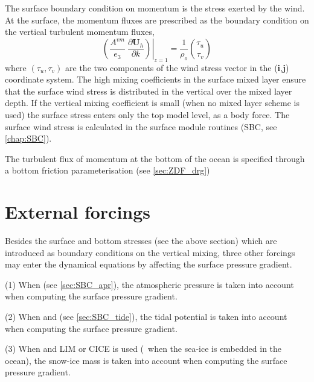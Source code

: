 \documentclass[../main/NEMO_manual]{subfiles}
\begin{document}
The surface boundary condition on momentum is the stress exerted by the wind.
At the surface, the momentum fluxes are prescribed as the boundary condition on
the vertical turbulent momentum fluxes,
\begin{equation}
  \label{eq:DYN_zdf_sbc}
  \left.{\left( {\frac{A^{vm} }{e_3 }\ \frac{\partial \textbf{U}_h}{\partial k}} \right)} \right|_{z=1}
  = \frac{1}{\rho_o} \binom{\tau_u}{\tau_v }
\end{equation}
where $\left( \tau_u ,\tau_v \right)$ are the two components of the wind stress vector in
the (\textbf{i},\textbf{j}) coordinate system.
The high mixing coefficients in the surface mixed layer ensure that the surface wind stress is distributed in
the vertical over the mixed layer depth.
If the vertical mixing coefficient is small (when no mixed layer scheme is used)
the surface stress enters only the top model level, as a body force.
The surface wind stress is calculated in the surface module routines (SBC, see \autoref{chap:SBC}).

The turbulent flux of momentum at the bottom of the ocean is specified through a bottom friction parameterisation
(see \autoref{sec:ZDF_drg})

\section{External forcings}
\label{sec:DYN_forcing}

Besides the surface and bottom stresses (see the above section)
which are introduced as boundary conditions on the vertical mixing,
three other forcings may enter the dynamical equations by affecting the surface pressure gradient.

(1) When  (see \autoref{sec:SBC_apr}),
the atmospheric pressure is taken into account when computing the surface pressure gradient.

(2) When  and  (see \autoref{sec:SBC_tide}),
the tidal potential is taken into account when computing the surface pressure gradient.

(3) When  and LIM or CICE is used
(\ie\ when the sea-ice is embedded in the ocean),
the snow-ice mass is taken into account when computing the surface pressure gradient.

\end{document}

